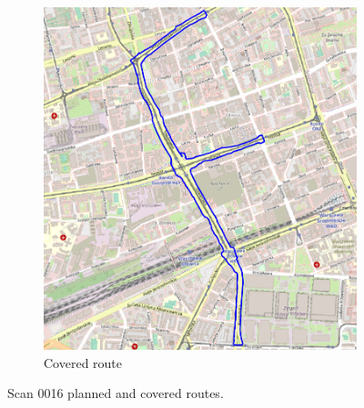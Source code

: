 \documentclass[a4paper,12pt]{book}
\begin{document}
\begin{enumerate}
\begin{figure}[H]
\begin{subfigure}{.63\textwidth}
			\includegraphics[width=1\linewidth]{route_c16}
			\caption{Covered route}
			\label{fig:b16}
		\end{subfigure}
		\caption{Scan 0016 planned and covered routes.}
		\label{fig:fig16}
	\end{figure} 
\end{enumerate}
\end{document}
